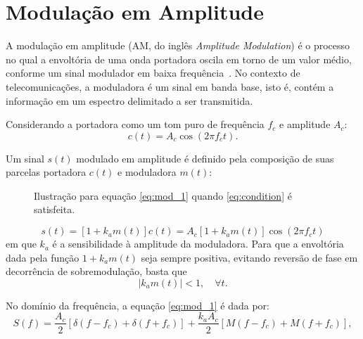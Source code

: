 \section{Modulação em Amplitude}
A modulação em amplitude (AM, do inglês
\textit{Amplitude Modulation}) é o processo no qual a envoltória de uma onda
portadora oscila em torno de um valor médio, conforme um sinal modulador em
baixa frequência~\cite{haykin2008}. No contexto de telecomunicações, a
moduladora é um sinal em banda base, isto é, contém a informação em um espectro
delimitado a ser transmitida.

Considerando a portadora como um tom puro de frequência $f_c$ e amplitude $A_c$:
\begin{equation}
    c(t) = A_c \cos(2\pi f_c t).
\end{equation}

    Um sinal $s(t)$ modulado em amplitude é definido pela composição de suas
parcelas portadora $c(t)$ e moduladora $m(t)$:
\begin{figure}[H]
    \centering
    \resizebox{1.0\textwidth}{!}{}
    \caption{Ilustração para equação \eqref{eq:mod_1} quando \eqref{eq:condition} é satisfeita.}
\end{figure}
\begin{equation}\label{eq:mod_1}
    s(t) = [1+k_a m(t)]c(t) = A_c[1+k_a m(t)]\cos(2\pi f_c t)
\end{equation}
em que $k_a$ é a sensibilidade à amplitude da moduladora. Para que a envoltória
dada pela função $1+k_a m(t)$ seja sempre positiva, evitando reversão de fase em
decorrência de sobremodulação, basta que
\begin{equation}\label{eq:condition}
    |k_a m(t)| < 1, \quad \forall t.
\end{equation}


  No domínio da frequência, a equação \eqref{eq:mod_1} é dada por:
\begin{equation}
    S(f) = \frac{A_c}{2} [\delta (f - f_c) + \delta(f + f_c)] + \frac{k_a A_c}{2} [M(f - f_c) + M (f + f_c)], \label{eq:mod_2}
\end{equation}

